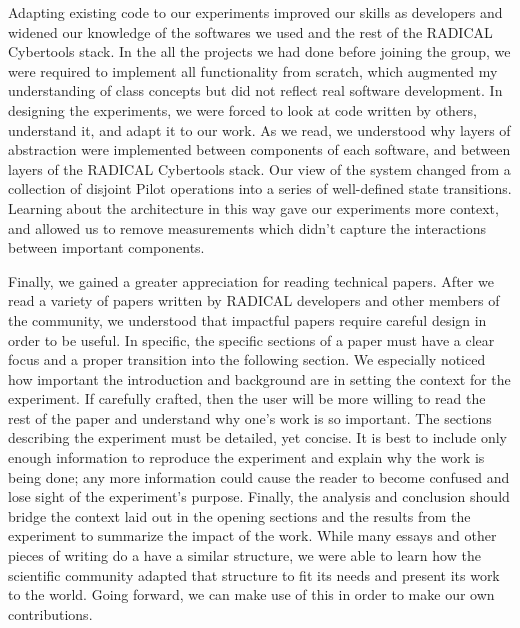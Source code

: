 \documentclass[]{article}
\begin{document}
	Adapting existing code to our experiments improved our skills as developers and widened our knowledge of the softwares we used and the rest of the RADICAL Cybertools stack. In the all the projects we had done before joining the group, we were required to implement all functionality from scratch, which augmented my understanding of class concepts but did not reflect real software development. In designing the experiments, we were forced to look at code written by others, understand it, and adapt it to our work. As we read, we understood why layers of abstraction were implemented between components of each software, and between layers of the RADICAL Cybertools stack. Our view of the system changed from a collection of disjoint Pilot operations into a series of well-defined state transitions. Learning about the architecture in this way gave our experiments more context, and allowed us to remove measurements which didn't capture the interactions between important components. 

	Finally, we gained a greater appreciation for reading technical papers. After we read a variety of papers written by RADICAL developers and other members of the community, we understood that impactful papers require careful design in order to be useful. In specific, the specific sections of a paper must have a clear focus and a proper transition into the following section. We especially noticed how important the introduction and background are in setting the context for the experiment. If carefully crafted, then the user will be more willing to read the rest of the paper and understand why one's work is so important. The sections describing the experiment must be detailed, yet concise. It is best to include only enough information to reproduce the experiment and explain why the work is being done; any more information could cause the reader to become confused and lose sight of the experiment's purpose. Finally, the analysis and conclusion should bridge the context laid out in the opening sections and the results from the experiment to summarize the impact of the work. While many essays and other pieces of writing do a have a similar structure, we were able to learn how the scientific community adapted that structure to fit its needs and present its work to the world. Going forward, we can make use of this in order to make our own contributions.

\nocite{pstar}
\nocite{saga_paper}
\nocite{rp_arch}
\nocite{k_means}
\nocite{apache_hadoop_yarn}
\nocite{hadoop_paper}

{}
		
\end{document}
